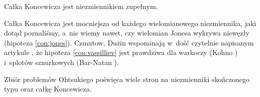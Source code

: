 \begin{conjecture}
    \label{con:vassilliev}
    Całka Koncewicza jest niezmiennikiem zupełnym.
\end{conjecture}

Całka Koncewicza jest mocniejsza od każdego wielomianowego niezmiennika, jaki dotąd poznaliśmy, a~nie wiemy nawet, czy wielomian Jonesa wykrywa niewęzły (hipoteza \ref{con:jones}).
%
Czmutow, Dużin wspominają w~dość czytelnie napisanym artykule \cite{chmutov05}, że hipoteza \ref{con:vassilliev} jest prawdziwa dla warkoczy (Kohno \cite{kohno87}) i~splotów sznurkowych (Bar-Natan \cite{barnatandror95}).
%
%
%
%
%
%

Zbiór problemów Ohtsukiego \cite[s. 398-444]{ohtsuki02} poświęca wiele stron na niezmienniki skończonego typu oraz całkę Koncewicza.

%

